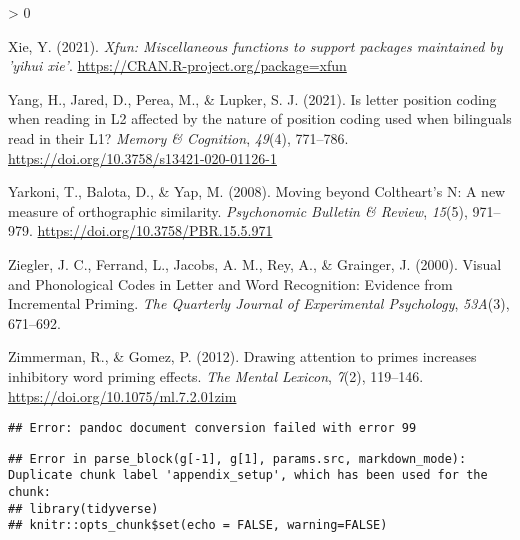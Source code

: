 \documentclass[
  english,
  man,floatsintext]{apa6}
\newlength{\cslhangindent}
\newenvironment{CSLReferences}[2] %
 {%
  \setlength{\parindent}{0pt}
  \ifodd #1 \everypar{\setlength{\hangindent}{\cslhangindent}}\ignorespaces\fi
  \ifnum #2 > 0
  \setlength{\parskip}{#2\baselineskip}
  \fi
 }%
 {}
\begin{document}
\begin{CSLReferences}{1}{0}
\leavevmode\hypertarget{ref-R-xfun}{}%
Xie, Y. (2021). \emph{Xfun: Miscellaneous functions to support packages maintained by 'yihui xie'}. \url{https://CRAN.R-project.org/package=xfun}

\leavevmode\hypertarget{ref-Yang_2021}{}%
Yang, H., Jared, D., Perea, M., \& Lupker, S. J. (2021). Is letter position coding when reading in L2 affected by the nature of position coding used when bilinguals read in their L1? \emph{Memory {\&} Cognition}, \emph{49}(4), 771--786. \url{https://doi.org/10.3758/s13421-020-01126-1}

\leavevmode\hypertarget{ref-yarkoni2008}{}%
Yarkoni, T., Balota, D., \& Yap, M. (2008). Moving beyond Coltheart{'}s N: A new measure of orthographic similarity. \emph{Psychonomic Bulletin \& Review}, \emph{15}(5), 971--979. \url{https://doi.org/10.3758/PBR.15.5.971}

\leavevmode\hypertarget{ref-ziegler2000}{}%
Ziegler, J. C., Ferrand, L., Jacobs, A. M., Rey, A., \& Grainger, J. (2000). Visual and Phonological Codes in Letter and Word Recognition: Evidence from Incremental Priming. \emph{The Quarterly Journal of Experimental Psychology}, \emph{53A}(3), 671--692.

\leavevmode\hypertarget{ref-Zimmerman_2012}{}%
Zimmerman, R., \& Gomez, P. (2012). Drawing attention to primes increases inhibitory word priming effects. \emph{The Mental Lexicon}, \emph{7}(2), 119--146. \url{https://doi.org/10.1075/ml.7.2.01zim}

\end{CSLReferences}

\newpage

\endgroup

\begin{verbatim}
## Error: pandoc document conversion failed with error 99
\end{verbatim}

\begin{verbatim}
## Error in parse_block(g[-1], g[1], params.src, markdown_mode): Duplicate chunk label 'appendix_setup', which has been used for the chunk:
## library(tidyverse)
## knitr::opts_chunk$set(echo = FALSE, warning=FALSE)
\end{verbatim}


\clearpage
\end{document}
